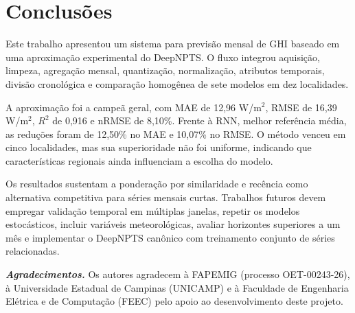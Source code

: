 \documentclass[12pt,a4paper]{article}
\begin{document}
\section{Conclusões}
\label{sec:conclusoes}

Este trabalho apresentou um sistema para previsão mensal de GHI baseado em uma aproximação experimental do DeepNPTS. O fluxo integrou aquisição, limpeza, agregação mensal, quantização, normalização, atributos temporais, divisão cronológica e comparação homogênea de sete modelos em dez localidades.

A aproximação foi a campeã geral, com MAE de 12,96 W/m$^2$, RMSE de 16,39 W/m$^2$, $R^2$ de 0,916 e nRMSE de 8,10\%. Frente à RNN, melhor referência média, as reduções foram de 12,50\% no MAE e 10,07\% no RMSE. O método venceu em cinco localidades, mas sua superioridade não foi uniforme, indicando que características regionais ainda influenciam a escolha do modelo.

Os resultados sustentam a ponderação por similaridade e recência como alternativa competitiva para séries mensais curtas. Trabalhos futuros devem empregar validação temporal em múltiplas janelas, repetir os modelos estocásticos, incluir variáveis meteorológicas, avaliar horizontes superiores a um mês e implementar o DeepNPTS canônico com treinamento conjunto de séries relacionadas.

\vspace{12pt}
\noindent\textbf{\textit{Agradecimentos.}} Os autores agradecem à FAPEMIG (processo OET-00243-26), à Universidade Estadual de Campinas (UNICAMP) e à Faculdade de Engenharia Elétrica e de Computação (FEEC) pelo apoio ao desenvolvimento deste projeto.
\end{document}
